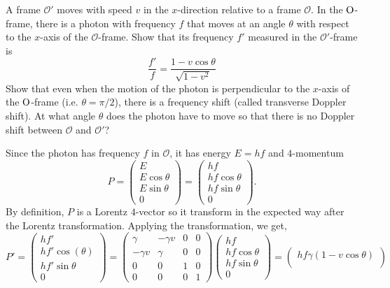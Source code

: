 \documentclass{../../templates/lkx_pset}
\begin{document}
\begin{problem}{2}
  A frame $\mathcal{O}'$ moves with speed $v$ in the $x$-direction relative to a frame $\mathcal{O}$. In the $\mathrm{O}$-frame, there is a photon with frequency $f$ that moves at an angle $\theta$ with respect to the $x$-axis of the $\mathcal{O}$-frame. Show that its frequency $f'$ measured in the $\mathcal{O}'$-frame is
\[
	\frac{f'}{f} = \frac{1-v\cos\theta}{\sqrt{1-v^2}}
\]
Show that even when the motion of the photon is perpendicular to the $x$-axis of the $\mathrm{O}$-frame (i.e. $\theta=\pi/2$), there is a frequency shift (called transverse Doppler shift). At what angle $\theta$ does the photon have to move so that there is no Doppler shift between $\mathcal{O}$ and $\mathcal{O}'$?
\end{problem}
\begin{solution}
	Since the photon has frequency $f$ in $\mathcal{O}$, it has energy $E=hf$ and $4$-momentum
	\[
		P = \begin{pmatrix}E\\E\cos\theta\\E\sin\theta\\0\end{pmatrix} =
		\begin{pmatrix}hf\\hf\cos\theta\\hf\sin\theta\\0\end{pmatrix}.
	\]
	By definition, $P$ is a Lorentz $4$-vector so it transform in the expected way after the Lorentz transformation. Applying the transformation, we get,
	\[
		P' = \begin{pmatrix}hf'\\ hf'\cos(\theta)\\ hf'\sin\theta\\0\end{pmatrix} = \begin{pmatrix}\gamma & -\gamma v & 0 & 0\\ - \gamma v & \gamma & 0 & 0 \\ 0 & 0 & 1 &0 \\ 0&0&0&1\end{pmatrix}
		\begin{pmatrix}hf\\hf\cos\theta\\hf\sin\theta\\0\end{pmatrix} =
		\begin{pmatrix}hf\gamma ( 1-v\cos\theta) \\

\end{pmatrix}\]
\end{solution}
\end{document}
